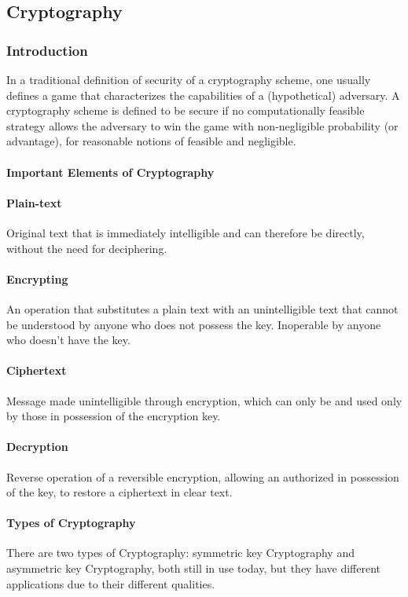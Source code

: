 \subsection{Cryptography}
\subsubsection{Introduction}
In a traditional definition of security of a cryptography scheme, one usually defines a game that characterizes the capabilities of a (hypothetical) adversary. A cryptography scheme is defined to be secure if no computationally feasible strategy allows the adversary to win the game with non-negligible probability (or advantage), for reasonable notions of feasible and negligible.
\cite{maurer2011constructive}

\paragraph{Important Elements of Cryptography}
\paragraph{Plain-text}
Original text that is immediately intelligible and can therefore be directly, without the need for deciphering.
\cite{ramet_r3.09}

\paragraph{Encrypting}
An operation that substitutes a plain text with an unintelligible text that cannot be understood by anyone who does not possess the key. Inoperable by anyone who doesn't have the key.

\paragraph{Ciphertext}
Message made unintelligible through encryption, which can only be and used only by those in possession of the encryption key.

\paragraph{Decryption}
Reverse operation of a reversible encryption, allowing an authorized in possession of the key, to restore a ciphertext in clear text.

\paragraph{Types of Cryptography}
There are two types of Cryptography: symmetric key Cryptography and asymmetric key Cryptography, both still in use today, but they have different applications due to their different qualities.

